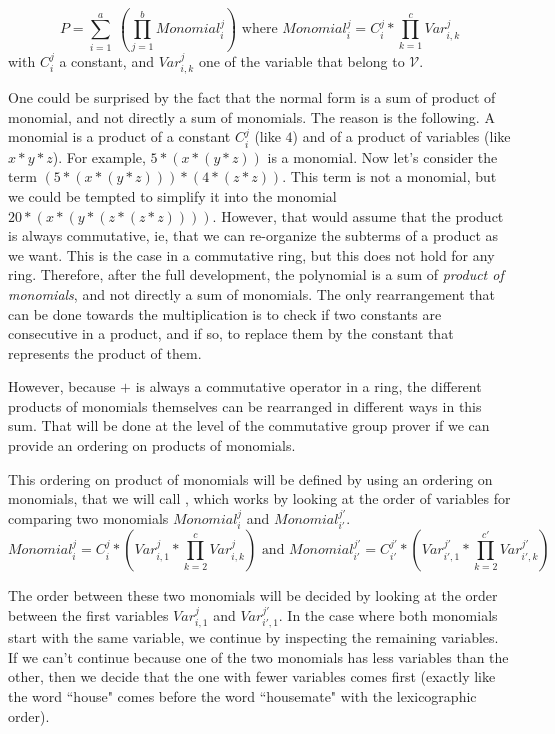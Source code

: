 \[
P = \sum_{i=1}^{a}\ (\prod_{j=1}^{b} Monomial_{i}^j)
\text{ where } 
Monomial_{i}^j = C_{i}^j * \prod_{k=1}^{c} Var_{i,k}^{j}
\]
with $C_{i}^j$ a constant, and $Var_{i,k}^{j}$ one of the variable that belong to $\mathcal{V}$.

One could be surprised by the fact that the normal form is a sum of product of monomial, and not directly a sum of monomials. The reason is the following. A monomial is a product of a constant $C_{i}^j$ (like $4$) and of a product of variables (like $x*y*z$). For example,  $5*(x*(y*z))$ is a monomial. Now let's consider the term $(5*(x*(y*z))) * (4*(z*z))$. This term is not a monomial, but we could be tempted to simplify it into the monomial $20*(x*(y*(z*(z*z))))$. However, that would assume that the product is always commutative, ie, that we can re-organize the subterms of a product as we want. This is the case in a commutative ring, but this does not hold for any ring. Therefore, after the full development, the polynomial is a sum of \emph{product of monomials}, and not directly a sum of monomials. The only rearrangement that can be done towards the multiplication is to check if two constants are consecutive in a product, and if so, to replace them by the constant that represents the product of them.

However, because $+$ is always a commutative operator in a ring, the different products of monomials themselves can be rearranged in different ways in this sum. That will be done at the level of the commutative group prover if we can provide an ordering on products of monomials.

This ordering on product of monomials will be defined by using an ordering on monomials, that we will call , which works by looking at the order of variables for comparing two monomials $Monomial_{i}^{j}$ and $Monomial_{i'}^{j'}$.
\[
Monomial_{i}^{j} = C_{i}^{j} * (Var_{i,1}^{j} * \prod_{k=2}^{c} Var_{i,k}^{j})
\text{ and }
Monomial_{i'}^{j'} = C_{i'}^{j'} * (Var_{i',1}^{j'} * \prod_{k=2}^{c'} Var_{i',k}^{j'})
\]

The order between these two monomials will be decided by looking at the order between the first variables $Var_{i,1}^{j}$ and $Var_{i',1}^{j'}$. In the case where both monomials start with the same variable, we continue by inspecting the remaining variables. If we can't continue because one of the two monomials has less variables than the other, then we decide that the one with fewer variables comes first (exactly like the word ``house" comes before the word ``housemate" with the lexicographic order).

